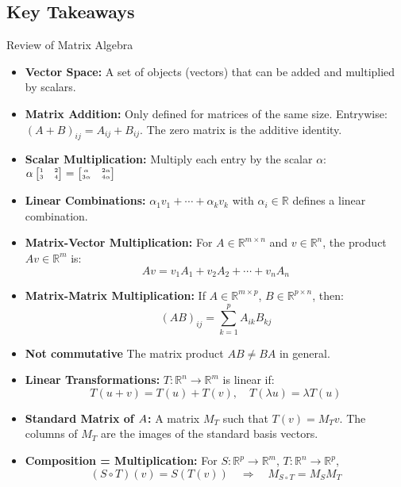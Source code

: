 \documentclass[a4paper, 9pt]{extarticle}
\begin{document}
\subsection*{Key Takeaways}
\begin{takeaway-box}{Review of Matrix Algebra}{}
\begin{itemize}
  \item \textbf{Vector Space:} A set of objects (vectors) that can be added and multiplied by scalars.
  \item \textbf{Matrix Addition:} Only defined for matrices of the same size. Entrywise: $(A + B)_{ij} = A_{ij} + B_{ij}$. The zero matrix is the additive identity.

  \item \textbf{Scalar Multiplication:} Multiply each entry by the scalar $\alpha$:
        $ \tiny
          \alpha \begin{bmatrix} 1 & 2 \\ 3 & 4 \end{bmatrix} =
          \begin{bmatrix} \alpha & 2\alpha \\ 3\alpha & 4\alpha \end{bmatrix}
        $
  \item \textbf{Linear Combinations:} $\alpha_1 v_1 + \cdots + \alpha_k v_k $ with $ \alpha_i \in \mathbb{R} $ defines a linear combination.

  \item \textbf{Matrix-Vector Multiplication:} For $ A \in \mathbb{R}^{m \times n} $ and $ v \in \mathbb{R}^n $, the product $ Av \in \mathbb{R}^m $ is:
        $$
          Av = v_1 A_1 + v_2 A_2 + \cdots + v_n A_n
        $$
  \item \textbf{Matrix-Matrix Multiplication:} If $ A \in \mathbb{R}^{m \times p} $, $ B \in \mathbb{R}^{p \times n} $, then:
        $$
          (AB)_{ij} = \sum_{k=1}^p A_{ik} B_{kj}
        $$
  \item  \textbf{Not commutative} The matrix product $AB \neq BA$ in general.
  \item \textbf{Linear Transformations:} $ T : \mathbb{R}^n \to \mathbb{R}^m $ is linear if:
        $$
          T(u + v) = T(u) + T(v), \quad T(\lambda u) = \lambda T(u)
        $$
  \item \textbf{Standard Matrix of $\boldmath{A}$:} A matrix $ M_T $ such that $ T(v) = M_T v $. The columns of $ M_T $ are the images of the standard basis vectors.

  \item \textbf{Composition = Multiplication:} For $ S : \mathbb{R}^p \to \mathbb{R}^m $, $ T : \mathbb{R}^n \to \mathbb{R}^p $,
        $$
          (S \circ T)(v) = S(T(v)) \quad \Rightarrow \quad M_{S \circ T} = M_S M_T
        $$
\end{itemize}
\end{takeaway-box}
\end{document}
